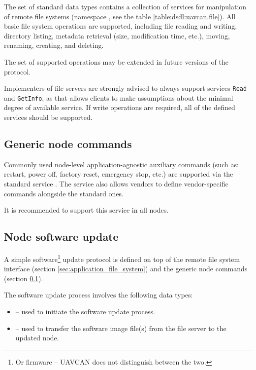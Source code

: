 The set of standard data types contains a collection of services for manipulation of remote file systems
(namespace , see the table \ref{table:dsdl:uavcan.file}).
All basic file system operations are supported, including file reading and writing,
directory listing, metadata retrieval (size, modification time, etc.), moving, renaming, creating, and deleting.

The set of supported operations may be extended in future versions of the protocol.

Implementers of file servers are strongly advised to always support services \verb|Read| and \verb|GetInfo|,
as that allows clients to make assumptions about the minimal degree of available service.
If write operations are required, all of the defined services should be supported.


\subsection{Generic node commands}\label{sec:application_generic_node_commands}

Commonly used node-level application-agnostic auxiliary commands
(such as: restart, power off, factory reset, emergency stop, etc.)
are supported via the standard service .
The service also allows vendors to define vendor-specific commands alongside the standard ones.

It is recommended to support this service in all nodes.

\subsection{Node software update}

A simple software\footnote{Or firmware -- UAVCAN does not distinguish between the two.}
update protocol is defined on top of the remote file system interface (section \ref{sec:application_file_system})
and the generic node commands (section \ref{sec:application_generic_node_commands}).

The software update process involves the following data types:

\begin{itemize}
    \item {} -- used to initiate the software update process.
    \item {} -- used to transfer the software image file(s)
          from the file server to the updated node.
\end{itemize}

